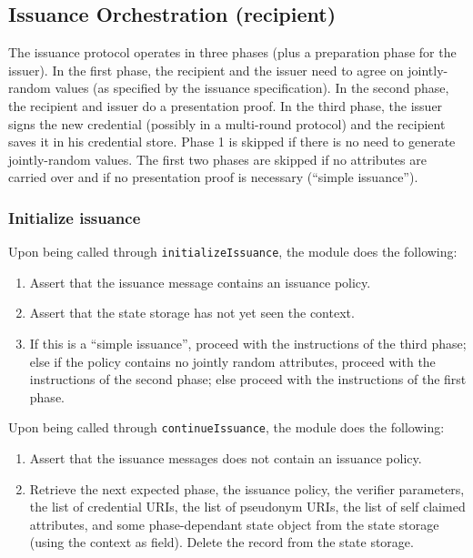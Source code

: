   \subsection{Issuance Orchestration (recipient)}
  The issuance protocol operates in three phases (plus a preparation phase for the issuer). In the first phase, the recipient and the issuer need to agree
  on jointly-random values (as specified by the issuance specification).
  In the second phase, the recipient and issuer do a presentation proof.
  In the third phase, the issuer signs the new credential (possibly in a multi-round protocol) and the recipient
  saves it in his credential store.
  Phase 1 is skipped if there is no need to generate jointly-random values. The first two phases are skipped if no attributes are
  carried over and if no presentation proof is necessary (``simple issuance'').

  \subsubsection{Initialize issuance}
  Upon being called through \texttt{initializeIssuance}, the module does the following:
  \begin{enumerate}
    \item Assert that the issuance message contains an issuance policy.
    \item Assert that the state storage has not yet seen the context.
    \item If this is a ``simple issuance'', proceed with the instructions of the third phase;
      else if the policy contains no jointly random attributes, proceed with the instructions of the second phase; else proceed with the instructions
      of the first phase.
  \end{enumerate}
  Upon being called through \texttt{continueIssuance}, the module does the following:
  \begin{enumerate}
  \item Assert that the issuance messages does not contain an issuance policy.
  \item Retrieve the next expected phase, the issuance policy, the verifier parameters, the list of credential URIs, the list of
    pseudonym URIs, the list of self claimed attributes, and some phase-dependant state object from the state storage (using the context as field).
    Delete the record from the state storage.
  \end{enumerate}


